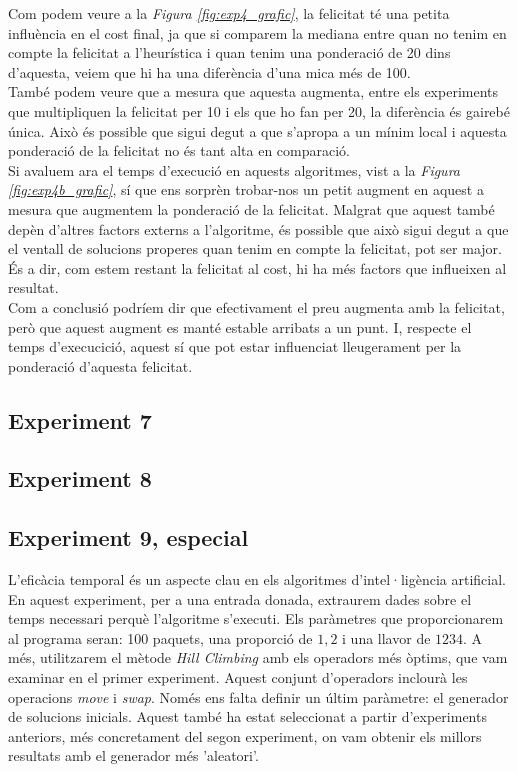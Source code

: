 \documentclass[a4paper]{article}
\begin{document}
	Com podem veure a la \textit{Figura \ref{fig:exp4_grafic}}, la felicitat té una petita influència en el cost final, ja que si comparem la mediana entre quan no tenim en compte la felicitat a l'heurística i quan tenim una ponderació de 20 dins d'aquesta, veiem que hi ha una diferència d'una mica més de 100. \\
	
	També podem veure que a mesura que aquesta augmenta, entre els experiments que multipliquen la felicitat per 10 i els que ho fan per 20, la diferència és gairebé única. Això és possible que sigui degut a que s'apropa a un mínim local i aquesta ponderació de la felicitat no és tant alta en comparació. \\
	
	Si avaluem ara el temps d'execució en aquests algoritmes, vist a la \textit{Figura \ref{fig:exp4b_grafic}}, sí que ens sorprèn trobar-nos un petit augment en aquest a mesura que augmentem la ponderació de la felicitat. Malgrat que aquest també depèn d'altres factors externs a l'algoritme, és possible que això sigui degut a que el ventall de solucions properes quan tenim en compte la felicitat, pot ser major. És a dir, com estem restant la felicitat al cost, hi ha més factors que influeixen al resultat. \\
	
	Com a conclusió podríem dir que efectivament el preu augmenta amb la felicitat, però que aquest augment es manté estable arribats a un punt. I, respecte el temps d'execucició, aquest sí que pot estar influenciat lleugerament per la ponderació d'aquesta felicitat. \\
	
	
	\subsection{Experiment 7}
	
	
	\subsection{Experiment 8}
	

	\subsection{Experiment 9, especial}
	
	L'eficàcia temporal és un aspecte clau en els algoritmes d'intel·ligència artificial. En aquest experiment, per a una entrada donada, extraurem dades sobre el temps necessari perquè l'algoritme s'executi. Els paràmetres que proporcionarem al programa seran: 100 paquets, una proporció de $1,2$ i una llavor de $1234$. A més, utilitzarem el mètode \textit{Hill Climbing} amb els operadors més òptims, que vam examinar en el primer experiment. Aquest conjunt d'operadors inclourà les operacions \textit{move} i \textit{swap}. Només ens falta definir un últim paràmetre: el generador de solucions inicials. Aquest també ha estat seleccionat a partir d'experiments anteriors, més concretament del segon experiment, on vam obtenir els millors resultats amb el generador més 'aleatori'. \\
	
\end{document}
